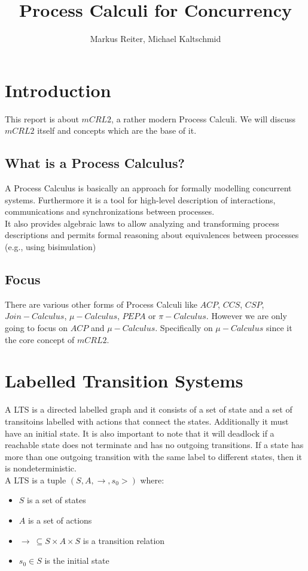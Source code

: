 \documentclass{report}
\title{Process Calculi for Concurrency}
\author{Markus Reiter, Michael Kaltschmid}
\begin{document}
  \maketitle
  \tableofcontents

  \section{Introduction}
  This report is about $mCRL2$, a rather modern Process Calculi. We will discuss $mCRL2$ itself and concepts which are the base of it.
  \subsection{What is a Process Calculus?}
  A Process Calculus is basically an approach for formally modelling concurrent systems.
  Furthermore it is a tool for high-level description of interactions, communications and synchronizations between processes. \\
  It also provides algebraic laws to allow analyzing and transforming process descriptions and permits formal reasoning about equivalences between processes (e.g., using bisimulation) \\

  \subsection{Focus}
  There are various other forms of Process Calculi like $ACP$, $CCS$, $CSP$, $Join-Calculus$, $\mu-Calculus$, $PEPA$ or $\pi-Calculus$. However we are only going to focus on $ACP$ and $\mu-Calculus$. Specifically on $\mu-Calculus$ since it the core concept of $mCRL2$.

  \section{Labelled Transition Systems}
  A LTS is a directed labelled graph and it consists of a set of state and a set of transitoins labelled with actions that connect the states. Additionally it must have an initial state. It is also important to note that it will deadlock if a reachable state does not terminate and has no outgoing
  transitions. If a state has more than one outgoing transition with the same label to different states, then it is nondeterministic. \\[12pt]
  A LTS is a tuple $(S, A, \to,s_0>)$ where: \\

  \begin{itemize}
    \item $S$ is a set of states \\
    \item $A$ is a set of actions \\
    \item $\to\ \subseteq S \times A \times S$ is a transition relation \\
    \item $s_0 \in S$ is the initial state \\
  \end{itemize}
\end{document}
